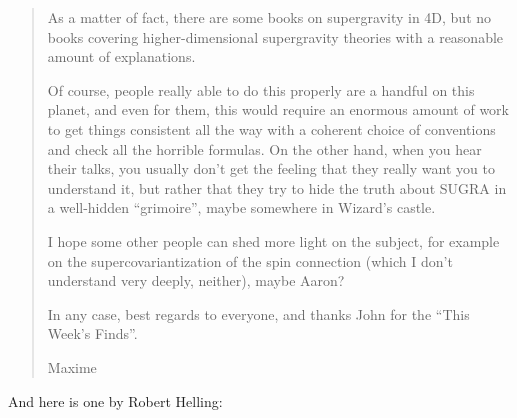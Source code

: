 \documentclass{article}
\begin{document}
\begin{quote}
As a matter of fact, there are some books on supergravity in 4D, but no
books covering higher-dimensional supergravity theories with a
reasonable amount of explanations.

Of course, people really able to do this properly are a handful on this
planet, and even for them, this would require an enormous amount of work
to get things consistent all the way with a coherent choice of
conventions and check all the horrible formulas. On the other hand, when
you hear their talks, you usually don't get the feeling that they really
want you to understand it, but rather that they try to hide the truth
about SUGRA in a well-hidden ``grimoire'', maybe somewhere in Wizard's
castle.

I hope some other people can shed more light on the subject, for example
on the supercovariantization of the spin connection (which I don't
understand very deeply, neither), maybe Aaron?

In any case, best regards to everyone, and thanks John for the ``This
Week's Finds''.

Maxime
\end{quote}

And here is one by Robert Helling:
\end{document}

